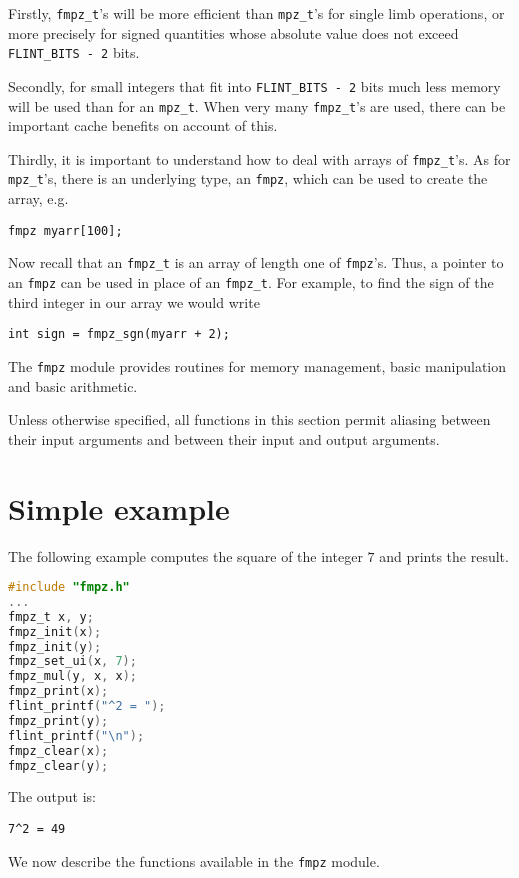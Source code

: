 \documentclass[a4paper,10pt]{book}
\newcommand{\code}{\lstinline}
\begin{document}
{{Firstly, \code{fmpz_t}'s will be more efficient than \code{mpz_t}'s for
single limb operations, or more precisely for signed quantities whose
absolute value does not exceed \code{FLINT_BITS - 2} bits.

Secondly, for small integers that fit into \code{FLINT_BITS - 2} bits
much less memory will be used than for an \code{mpz_t}.  When very many
\code{fmpz_t}'s are used, there can be important cache benefits on
account of this.

Thirdly, it is important to understand how to deal with arrays of
\code{fmpz_t}'s.  As for \code{mpz_t}'s, there is an underlying type,
an \code{fmpz}, which can be used to create the array, e.g.\
\begin{lstlisting}
fmpz myarr[100];
\end{lstlisting}
Now recall that an \code{fmpz_t} is an array of length one of \code{fmpz}'s.
Thus, a pointer to an \code{fmpz} can be used in place of an \code{fmpz_t}.
For example, to find the sign of the third integer in our array we would
write
\begin{lstlisting}
int sign = fmpz_sgn(myarr + 2);
\end{lstlisting}

The \code{fmpz} module provides routines for memory management, basic
manipulation and basic arithmetic.

Unless otherwise specified, all functions in this section permit aliasing
between their input arguments and between their input and output
arguments.

\section{Simple example}

The following example computes the square of the integer $7$ and prints
the result.
\begin{lstlisting}[language=c]
#include "fmpz.h"
...
fmpz_t x, y;
fmpz_init(x);
fmpz_init(y);
fmpz_set_ui(x, 7);
fmpz_mul(y, x, x);
fmpz_print(x);
flint_printf("^2 = ");
fmpz_print(y);
flint_printf("\n");
fmpz_clear(x);
fmpz_clear(y);
\end{lstlisting}

The output is:
\begin{lstlisting}
7^2 = 49
\end{lstlisting}

We now describe the functions available in the \code{fmpz} module.



}}
\end{document}
